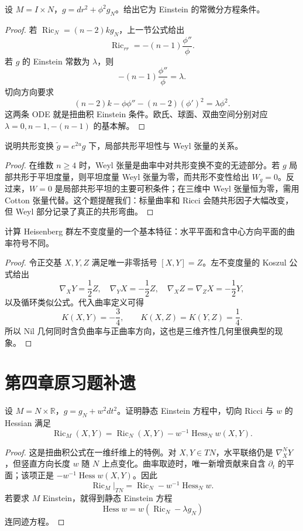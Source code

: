 \documentclass[11pt,a4paper,openany]{ctexbook}
\numberwithin{equation}{chapter}
\begin{document}
\begin{problem}
设 \(M=I\times N\)，\(g=dr^2+\phi^2g_N\)。给出它为 Einstein 的常微分方程条件。
\end{problem}
\begin{proof}
若 \(\operatorname{Ric}_N=(n-2)kg_N\)，上一节公式给出
\[
\operatorname{Ric}_{rr}=-(n-1)\frac{\phi''}{\phi}.
\]
若 \(g\) 的 Einstein 常数为 \(\lambda\)，则
\[
-(n-1)\frac{\phi''}{\phi}=\lambda.
\]
切向方向要求
\[
(n-2)k-\phi\phi''-(n-2)(\phi')^2=\lambda\phi^2.
\]
这两条 ODE 就是扭曲积 Einstein 条件。欧氏、球面、双曲空间分别对应 \(\lambda=0,n-1,-(n-1)\) 的基本解。
\end{proof}

\begin{problem}
说明共形变换 \(\tilde g=e^{2u}g\) 下，局部共形平坦性与 Weyl 张量的关系。
\end{problem}
\begin{proof}
在维数 \(n\ge4\) 时，Weyl 张量是曲率中对共形变换不变的无迹部分。若 \(g\) 局部共形于平坦度量，则平坦度量 Weyl 张量为零，而共形不变性给出 \(W_g=0\)。反过来，\(W=0\) 是局部共形平坦的主要可积条件；在三维中 Weyl 张量恒为零，需用 Cotton 张量代替。这个题提醒我们：标量曲率和 Ricci 会随共形因子大幅改变，但 Weyl 部分记录了真正的共形弯曲。
\end{proof}

\begin{problem}
计算 Heisenberg 群左不变度量的一个基本特征：水平平面和含中心方向平面的曲率符号不同。
\end{problem}
\begin{proof}
令正交基 \(X,Y,Z\) 满足唯一非零括号 \([X,Y]=Z\)。左不变度量的 Koszul 公式给出
\[
\nabla_XY=\frac12Z,\quad \nabla_YX=-\frac12Z,\quad
\nabla_XZ=\nabla_ZX=-\frac12Y,
\]
以及循环类似公式。代入曲率定义可得
\[
K(X,Y)=-\frac34,\qquad K(X,Z)=K(Y,Z)=\frac14.
\]
所以 Nil 几何同时含负曲率与正曲率方向，这也是三维齐性几何里很典型的现象。
\end{proof}

\section{第四章原习题补遗}

\begin{problem}
设 \(M=N\times\mathbb R\)，\(g=g_N+w^2dt^2\)。证明静态 Einstein 方程中，切向 Ricci 与 \(w\) 的 Hessian 满足
\[
\operatorname{Ric}_M(X,Y)=\operatorname{Ric}_N(X,Y)-w^{-1}\operatorname{Hess}_Nw(X,Y).
\]
\end{problem}
\begin{proof}
这是扭曲积公式在一维纤维上的特例。对 \(X,Y\in TN\)，水平联络仍是 \(\nabla^N_XY\)，但竖直方向长度 \(w\) 随 \(N\) 上点变化。曲率取迹时，唯一新增贡献来自含 \(\partial_t\) 的平面；该项正是 \(-w^{-1}\operatorname{Hess}w(X,Y)\)。因此
\[
\operatorname{Ric}_M|_{TN}=\operatorname{Ric}_N-w^{-1}\operatorname{Hess}_Nw.
\]
若要求 \(M\) Einstein，就得到静态 Einstein 方程
\[
\operatorname{Hess}w=w(\operatorname{Ric}_N-\lambda g_N)
\]
连同迹方程。
\end{proof}
\end{document}
